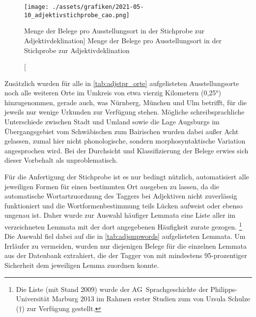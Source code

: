 \begin{figure}
\centering
\texttt{[image: ./assets/grafiken/2021-05-10\_adjektivstichprobe\_cao.png]}
\caption%
	[Menge der Belege pro Ausstellungs\-ort in der Stichprobe zur
		Adjektivdeklination]%
	{Menge der Belege pro Ausstellungs\-ort in der Stichprobe zur
		Adjektivdeklination\nocite{wiesinger1983:rede}}
\label{fig:adjstpr_orte}
\end{figure}

Zusätzlich wurden für alle in \cref{tab:adjstpr_orte} aufgelisteten
Ausstellungs\-orte noch alle weiteren Orte im Umkreis von etwa vierzig
Kilometern (0,25°) hinzugenommen, gerade auch, was Nürnberg, München und Ulm
betrifft, für die jeweils nur wenige Urkunden zur Verfügung stehen. Mögliche
schreibsprachliche Unterschiede zwischen Stadt und Umland sowie die Lage
Augsburgs im Übergangsgebiet vom Schwäbischen zum Bairischen wurden dabei außer
Acht gelassen, zumal hier nicht phonologische, sondern morphosyntaktische
Variation angesprochen wird. Bei der Durchsicht und Klassifizierung der Belege
erwies sich dieser Vorbehalt als unproblematisch.

Für die Anfertigung der Stichprobe ist es nur bedingt nützlich, automatisiert
alle jeweiligen Formen für einen bestimmten Ort ausgeben zu lassen, da die
automatische Wortartzuordnung des Taggers bei Adjektiven nicht zuverlässig
funktioniert und die Wortformenbestimmung teils Lücken aufweist oder ebenso
ungenau ist. Daher wurde zur Auswahl häufiger Lemmata eine Liste aller im
\WMU{} verzeichneten Lemmata mit der dort angegebenen Häufigkeit zurate
gezogen.%
%
	\footnote{Die Liste (mit Stand 2009) wurde der AG~Sprachgeschichte der
	Philipps-Universität Marburg 2013 im Rahmen erster Studien zum
	\CAO{} von Ursula Schulze (†) zur Verfügung gestellt.}
%
Die Auswahl fiel dabei auf die in \cref{tab:adjsmpwords} aufgelisteten Lemmata.
Um Irrläufer zu vermeiden, wurden nur diejenigen Belege für die einzelnen
Lemmata aus der Datenbank extrahiert, die der Tagger von \citet{schmid2019} mit
mindestens 95-prozentiger Sicherheit dem jeweiligen Lemma zuordnen konnte.

